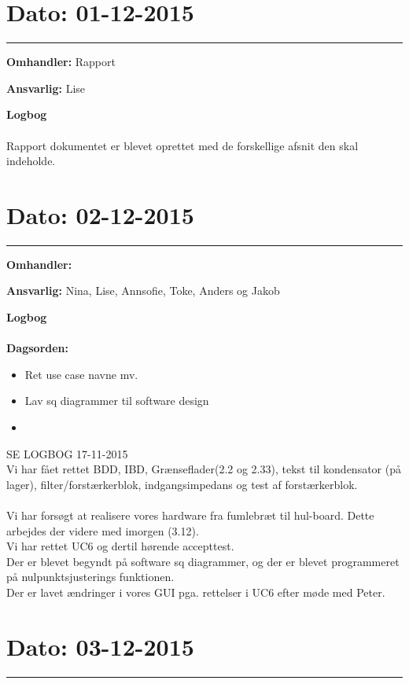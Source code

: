 \section{Dato: 01-12-2015 }
\hrule

\textbf{Omhandler:} Rapport

\textbf{Ansvarlig:} Lise

\textbf{Logbog}
\\
\\
Rapport dokumentet er blevet oprettet med de forskellige afsnit den skal indeholde. 




\section{Dato: 02-12-2015 }
\hrule

\textbf{Omhandler:} 

\textbf{Ansvarlig:} Nina, Lise, Annsofie, Toke, Anders og Jakob

\textbf{Logbog}
\\
\\
\textbf{Dagsorden:}
\begin{itemize}
	\item Ret use case navne mv.
	\item Lav sq diagrammer til software design
	\item 
\end{itemize}

SE LOGBOG 17-11-2015 \\
Vi har fået rettet BDD, IBD, Grænseflader(2.2 og 2.33), tekst til kondensator (på lager), filter/forstærkerblok, indgangsimpedans og test af forstærkerblok.
\\
\\
Vi har forsøgt at realisere vores hardware fra fumlebræt til hul-board. Dette arbejdes der videre med imorgen (3.12).\\
Vi har rettet UC6 og dertil hørende accepttest. \\
Der er blevet begyndt på software sq diagrammer, og der er blevet programmeret på nulpunktsjusterings funktionen. \\
Der er lavet ændringer i vores GUI pga. rettelser i UC6 efter møde med Peter.
	
	
	
	
\section{Dato: 03-12-2015 }
\hrule

